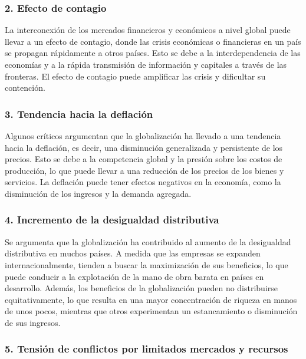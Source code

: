 \documentclass[
  jou,
  floatsintext,
  longtable,
  a4paper,
  nolmodern,
  notxfonts,
  notimes,
  12pt,
  colorlinks=true,linkcolor=blue,citecolor=blue,urlcolor=blue]{apa7}
\begin{document}
\subsubsection{2. Efecto de contagio}\label{efecto-de-contagio}

La interconexión de los mercados financieros y económicos a nivel global
puede llevar a un efecto de contagio, donde las crisis económicas o
financieras en un país se propagan rápidamente a otros países. Esto se
debe a la interdependencia de las economías y a la rápida transmisión de
información y capitales a través de las fronteras. El efecto de contagio
puede amplificar las crisis y dificultar su contención.

\subsubsection{3. Tendencia hacia la
deflación}\label{tendencia-hacia-la-deflaciuxf3n}

Algunos críticos argumentan que la globalización ha llevado a una
tendencia hacia la deflación, es decir, una disminución generalizada y
persistente de los precios. Esto se debe a la competencia global y la
presión sobre los costos de producción, lo que puede llevar a una
reducción de los precios de los bienes y servicios. La deflación puede
tener efectos negativos en la economía, como la disminución de los
ingresos y la demanda agregada.

\subsubsection{4. Incremento de la desigualdad
distributiva}\label{incremento-de-la-desigualdad-distributiva}

Se argumenta que la globalización ha contribuido al aumento de la
desigualdad distributiva en muchos países. A medida que las empresas se
expanden internacionalmente, tienden a buscar la maximización de sus
beneficios, lo que puede conducir a la explotación de la mano de obra
barata en países en desarrollo. Además, los beneficios de la
globalización pueden no distribuirse equitativamente, lo que resulta en
una mayor concentración de riqueza en manos de unos pocos, mientras que
otros experimentan un estancamiento o disminución de sus ingresos.

\subsubsection{5. Tensión de conflictos por limitados mercados y
recursos}\label{tensiuxf3n-de-conflictos-por-limitados-mercados-y-recursos}
\end{document}
